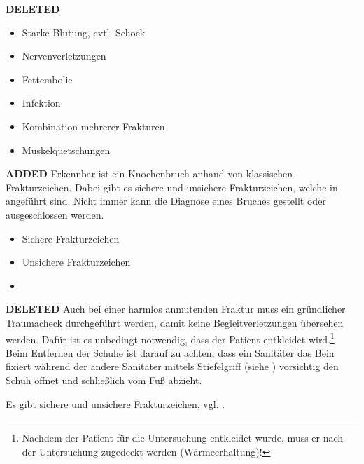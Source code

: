 \documentclass[
ngerman,
paper=a4,
asymmetric,
fontsize=10pt,
headings=small,
draft=false,
numbers=noenddot,
bibtotocnumbered,
footnotes=multiple,
]{scrreprt}
\newcommand{\jALT}{{\color{red}\sffamily\textbf{DELETED}\hrulefill\newline\newline}}
\newcommand{\jALTende}{\newline{\color{red}\rule{\linewidth}{2pt}\newline}}
\newcommand{\jNEU}{{\color{green}\sffamily\textbf{ADDED}\hrulefill\newline\newline}}
\newcommand{\jNEUende}{\newline{\color{green}\rule{\linewidth}{3pt}\newline}}
\begin{document}
\begin{enumerate}
\jALT
{}
{
}
{
 \begin{itemize}
  \item Starke Blutung, evtl. Schock
  \item Nervenverletzungen
  \item Fettembolie
  \item Infektion
  \item Kombination mehrerer Frakturen
  \item Muskelquetschungen
 \end{itemize}
}{}{}{}
\jALTende

\jNEU
{}
{\label{topic:frakturzeichen}%
Erkennbar ist ein Knochenbruch anhand von klassischen Frakturzeichen. 
Dabei gibt es sichere und unsichere Frakturzeichen, welche in
 angeführt sind. Nicht immer kann 
die Diagnose eines Bruches gestellt oder ausgeschlossen werden.
}
{
 \begin{itemize}
  \item Sichere Frakturzeichen
  \item Unsichere Frakturzeichen
  \item {}
 \end{itemize}
}{}{}{}
\jNEUende

\jALT
Auch bei einer harmlos anmutenden Fraktur muss ein
gründlicher Traumacheck durchgeführt werden, damit keine
Begleitverletzungen übersehen werden. Dafür ist es unbedingt
notwendig, dass der Patient entkleidet
wird.\footnote{Nachdem der Patient für die Untersuchung
entkleidet wurde, muss er nach der Untersuchung zugedeckt
werden (Wärmeerhaltung)!} Beim Entfernen der Schuhe ist
darauf zu achten, dass ein Sanitäter das Bein fixiert
während der andere Sanitäter mittels Stiefelgriff (siehe
) vorsichtig
den Schuh öffnet und schließlich vom Fuß abzieht.


{\label{topic:frakturzeichen}%
Es gibt sichere und unsichere Frakturzeichen, vgl.
.
 }{}{}{}{}
\jALTende



\end{enumerate}
\end{document}
